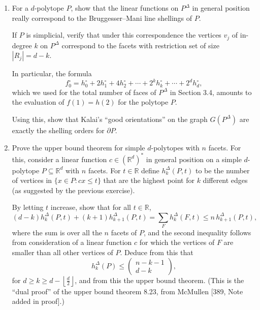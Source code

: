 \documentclass{article}
\begin{document}
\begin{enumerate}
\begin{proof}
\begin{enumerate}[label=(\roman*)]

\item idk tbh
\end{enumerate}
\end{proof}

\item For a $d$-polytope $P$, show that the linear functions on $P^{\Delta}$ in general position really correspond to the Bruggesser--Mani line shellings of $P$.

If $P$ is simplicial, verify that under this correspondence the vertices $v_j$ of in-degree $k$ on $P^{\Delta}$ correspond to the facets with restriction set of size $|R_j|=d-k$.

In particular, the formula
\[
f_0^{\circ}=h_0^{\circ}+2h_1^{\circ}+4h_2^{\circ}+\cdots+2^k h_k^{\circ}+\cdots+2^d h_d^{\circ},
\]
which we used for the total number of faces of $P^\Delta$ in Section 3.4, amounts to the evaluation of $f(1)=h(2)$ for the polytope $P$. 

Using this, show that Kalai's ``good orientations'' on the graph $G(P^\Delta)$ are exactly the shelling orders for $\partial P$.

\item Prove the upper bound theorem for simple $d$-polytopes with $n$ facets. For this, consider a linear function $c\in (\mathbb{R}^d)^*$ in general position on a simple $d$-polytope $P\subseteq \mathbb{R}^d$ with $n$ facets. For $t\in \mathbb{R}$ define $h_k^\Delta(P,t)$ to be the number of vertices in $\{x\in P : cx \le t\}$ that are the highest point for $k$ different edges (as suggested by the previous exercise). 

By letting $t$ increase, show that for all $t\in \mathbb{R}$,
\[
(d-k)h_k^\Delta(P,t) + (k+1)h_{k+1}^\Delta(P,t)
= \sum_F h_k^\Delta(F,t)
\le n\,h_{k+1}^\Delta(P,t),
\]
where the sum is over all the $n$ facets of $P$, and the second inequality follows from consideration of a linear function $c$ for which the vertices of $F$ are smaller than all other vertices of $P$. Deduce from this that
\[
h_k^\Delta(P) \le
\begin{pmatrix}
n-k-1\\
d-k
\end{pmatrix},
\]
for $d\ge k \ge d-\left\lfloor \frac{d}{2}\right\rfloor$, and from this the upper bound theorem. (This is the ``dual proof'' of the upper bound theorem 8.23, from McMullen [389, Note added in proof].)


\end{enumerate}
\end{document}
